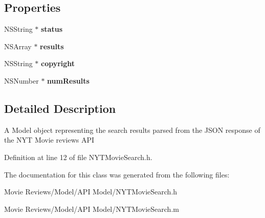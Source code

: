 \subsection*{Properties}
\begin{DoxyCompactItemize}
\item 
N\+S\+String $\ast$ {\bfseries status}\label{interface_n_y_t_movie_search_a81dfdeb69e00bb1b26ba3cc4b0d6905e}

\item 
N\+S\+Array $\ast$ {\bfseries results}\label{interface_n_y_t_movie_search_acb5d8dac3258c21be1e83106111c659b}

\item 
N\+S\+String $\ast$ {\bfseries copyright}\label{interface_n_y_t_movie_search_a87d7e982abfa653d561ffe297db2e67c}

\item 
N\+S\+Number $\ast$ {\bfseries num\+Results}\label{interface_n_y_t_movie_search_a3c942df3cef91ba3037c155949f56e87}

\end{DoxyCompactItemize}


\subsection{Detailed Description}
A Model object representing the search results parsed from the J\+S\+O\+N response of the N\+Y\+T Movie reviews A\+P\+I 

Definition at line 12 of file N\+Y\+T\+Movie\+Search.\+h.



The documentation for this class was generated from the following files\+:\begin{DoxyCompactItemize}
\item 
Movie Reviews/\+Model/\+A\+P\+I Model/N\+Y\+T\+Movie\+Search.\+h\item 
Movie Reviews/\+Model/\+A\+P\+I Model/N\+Y\+T\+Movie\+Search.\+m\end{DoxyCompactItemize}
